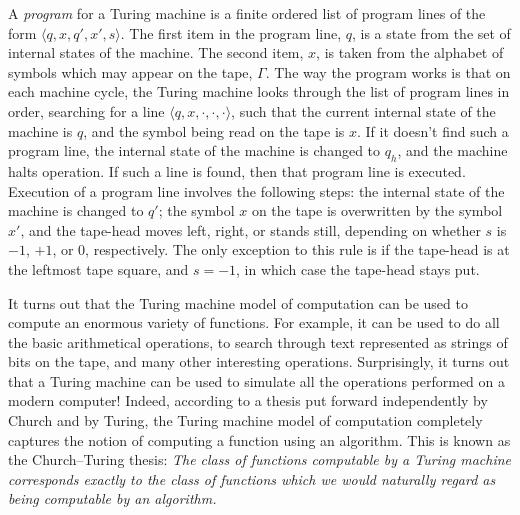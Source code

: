A \textit{program} for a Turing machine is a finite ordered list of program lines of the form $\langle q, x, q', x', s\rangle$. The first item in the program line, $q$, is a state from the set of internal states of the machine. The second item, $x$, is taken from the alphabet of symbols which may appear on the tape, $\Gamma$. The way the program works is that on each machine cycle, the Turing machine looks through the list of program lines in order, searching for a line $\langle q, x, \cdot, \cdot, \cdot \rangle$, such that the current internal state of the machine is $q$, and the symbol being read on the tape is $x$. If it doesn't find such a program line, the internal state of the machine is changed to $q_h$, and the machine halts operation. If such a line is found, then that program line is executed. Execution of a program line involves the following steps: the internal state of the machine is changed to $q'$; the symbol $x$ on the tape is overwritten by the symbol $x'$, and the tape-head moves left, right, or stands still, depending on whether $s$ is $-1$, $+1$, or $0$, respectively. The only exception to this rule is if the tape-head is at the leftmost tape square, and $s = -1$, in which case the tape-head stays put.
\vspace{1em}

It turns out that the Turing machine model of computation can be used to compute an enormous variety of functions. For example, it can be used to do all the basic arithmetical operations, to search through text represented as strings of bits on the tape, and many other interesting operations. Surprisingly, it turns out that a Turing machine can be used to simulate all the operations performed on a modern computer! Indeed, according to a thesis put forward independently by Church and by Turing, the Turing machine model of computation completely captures the notion of computing a function using an algorithm. This is known as the Church–Turing thesis:
\textit{The class of functions computable by a Turing machine corresponds exactly to the class of functions which we would naturally regard as being computable by an algorithm.}


